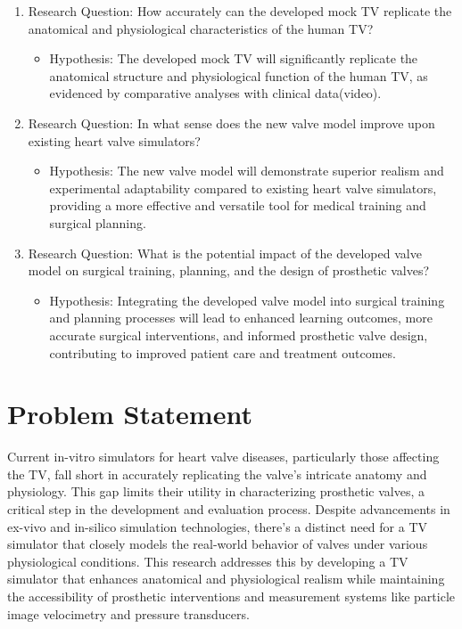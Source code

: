 \begin{enumerate}
    \item Research Question: How accurately can the developed mock \gls{TV} replicate the anatomical and physiological characteristics of the human \gls{TV}?
          \begin{itemize}
              \item Hypothesis: The developed mock \gls{TV} will significantly replicate the anatomical structure and physiological function of the human \gls{TV}, as evidenced by comparative analyses with clinical data(video).
          \end{itemize}

    \item Research Question: In what sense does the new valve model improve upon existing heart valve simulators?
          \begin{itemize}
              \item Hypothesis: The new valve model will demonstrate superior realism and experimental adaptability compared to existing heart valve simulators, providing a more effective and versatile tool for medical training and surgical planning.
          \end{itemize}

    \item Research Question: What is the potential impact of the developed valve model on surgical training, planning, and the design of prosthetic valves?
          \begin{itemize}
              \item Hypothesis: Integrating the developed valve model into surgical training and planning processes will lead to enhanced learning outcomes, more accurate surgical interventions, and informed prosthetic valve design, contributing to improved patient care and treatment outcomes.
          \end{itemize}
\end{enumerate}

\section{Problem Statement}
Current in-vitro simulators for heart valve diseases, particularly those affecting the \gls{TV}, fall short in accurately replicating the valve's intricate anatomy and physiology. This gap limits their utility in characterizing prosthetic valves, a critical step in the development and evaluation process. Despite advancements in ex-vivo and in-silico simulation technologies, there's a distinct need for a \gls{TV} simulator that closely models the real-world behavior of valves under various physiological conditions. This research addresses this by developing a \gls{TV} simulator that enhances anatomical and physiological realism while maintaining the accessibility of prosthetic interventions and measurement systems like particle image velocimetry and pressure transducers.

